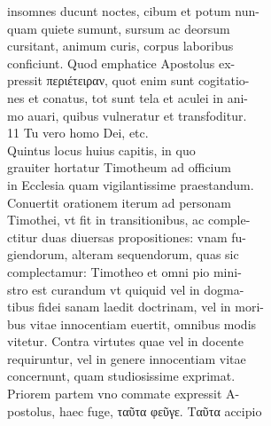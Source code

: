 \documentclass{article}
\begin{document}
\begin{pages}
                insomnes ducunt noctes, cibum et potum nun- \\
                quam quiete sumunt, sursum ac deorsum \\
                cursitant, animum curis, corpus laboribus \\
                conficiunt. Quod emphatice Apostolus ex- \\
                pressit περιέτειραν, quot enim sunt cogitatio- \\
                nes et conatus, tot sunt tela et aculei in ani- \\
                mo auari, quibus vulneratur et transfoditur. \\
                11 Tu vero homo Dei, etc. \\
                Quintus locus huius capitis, in quo \\
                grauiter hortatur Timotheum ad officium \\
                in Ecclesia quam vigilantissime praestandum. \\
                Conuertit orationem iterum ad personam \\
                Timothei, vt fit in transitionibus, ac comple- \\
                ctitur duas diuersas propositiones: vnam fu- \\
                giendorum, alteram sequendorum, quas sic \\
                complectamur: Timotheo et omni pio mini- \\
                stro est curandum vt quiquid vel in dogma- \\
                tibus fidei sanam laedit doctrinam, vel in mori- \\
                bus vitae innocentiam euertit, omnibus modis \\
                vitetur. Contra virtutes quae vel in docente \\
                requiruntur, vel in genere innocentiam vitae \\
                concernunt, quam studiosissime exprimat. \\
                Priorem partem vno commate expressit A- \\
                postolus, haec fuge, ταῦτα φεῦγε. Ταῦτα accipio \\

\end{pages}
\end{document}
